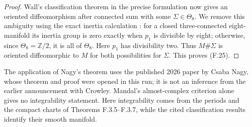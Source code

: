 \begin{proof}
Wall's classification theorem in the precise formulation
\cite[Recollection 2.2, Definition 2.5 and Theorem 2.6]{ffBHS}
now gives an oriented diffeomorphism after connected sum with
some $\Sigma\in\Theta_8$.  We remove this ambiguity using the
exact inertia calculation
\cite[Theorem 1.4 and its proof in Section 9]{ffNagy2026}:
for a closed three-connected eight-manifold its inertia group
is zero exactly when $p_1$ is divisible by eight; otherwise,
since $\Theta_8=\mathbb Z/2$, it is all of $\Theta_8$.
Here $p_1$ has divisibility two.  Thus $M\#\Sigma$ is oriented
diffeomorphic to $M$ for both possibilities for $\Sigma$.
This proves (F.25).
\end{proof}

The application of Nagy's theorem uses the published 2026 paper
by Csaba Nagy, whose theorem and proof were opened in this run;
it is not an inference from the earlier announcement with
Crowley.  Mandal's almost-complex criterion alone gives no
integrability statement.  Here integrability comes from the
periods and the compact charts of Theorems F.3.5--F.3.7, while
the cited classification results identify their smooth manifold.
